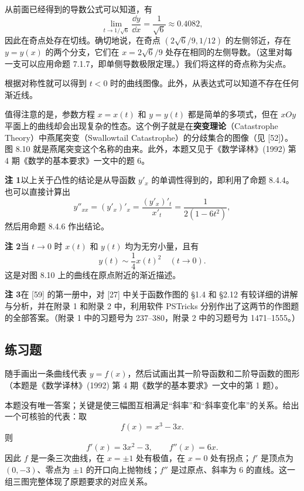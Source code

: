 \begin{xsolution}
从前面已经得到的导数公式可以知道，有
\[
  \lim_{t\to1/\sqrt6}\frac{\dd y}{\dd x}=\frac1{\sqrt6}\approx0.4082,
\]
因此在奇点处存在切线。确切地说，在奇点 $(2\sqrt6/9,1/12)$ 的左侧邻近，存在 $y=y(x)$ 的两个分支，它们在 $x=2\sqrt6/9$ 处存在相同的左侧导数。（这里对每一支可以应用命题 7.1.7，即单侧导数极限定理。）我们将这样的奇点称为尖点。

根据对称性就可以得到 $t<0$ 时的曲线图像。此外，从表达式可以知道不存在任何渐近线。

值得注意的是，参数方程 $x=x(t)$ 和 $y=y(t)$ 都是简单的多项式，但在 $xOy$ 平面上的曲线却会出现复杂的性态。这个例子就是在\textbf{突变理论}（Catastrophe Theory）中燕尾突变（Swallowtail Catastrophe）的分歧集合的图像（见 [52]）。图 8.10 就是燕尾突变这个名称的由来。此外，本题又见于《数学译林》(1992) 第 4 期《数学的基本要求》一文中的题 6。

\begin{xremark}
\textbf{注 1}\quad 以上关于凸性的结论是从导函数 $y'_x$ 的单调性得到的，即利用了命题 8.4.4。也可以直接计算出
\[
  y''_{xx}=(y'_x)'_x=\frac{(y'_x)'_t}{x'_t}
  =\frac1{2(1-6t^2)},
\]
然后用命题 8.4.6 作出结论。

\textbf{注 2}\quad 当 $t\to0$ 时 $x(t)$ 和 $y(t)$ 均为无穷小量，且有
\[
  y(t)\sim\frac14x(t)^2\quad(t\to0).
\]
这是对图 8.10 上的曲线在原点附近的渐近描述。

\textbf{注 3}\quad 在 [59] 的第一册中，对 [27] 中关于函数作图的 §1.4 和 §2.12 有较详细的讲解与分析，并在附录 1 和附录 2 中，利用软件 PSTricks 分别作出了这两节的作图题的全部答案。（附录 1 中的习题号为 237--380，附录 2 中的习题号为 1471--1555。）
\end{xremark}
\end{xsolution}

\subsection{练习题}

\begin{xexercise}[1]
随手画出一条曲线代表 $y=f(x)$，然后试画出其一阶导函数和二阶导函数的图形（本题是《数学译林》(1992) 第 4 期《数学的基本要求》一文中的第 1 题）。
\end{xexercise}
\begin{xsolution}
本题没有唯一答案；关键是使三幅图互相满足“斜率”和“斜率变化率”的关系。给出一个可核验的代表：取
\[
  f(x)=x^3-3x.
\]
则
\[
  f'(x)=3x^2-3,
  \qquad
  f''(x)=6x.
\]
因此 $f$ 是一条三次曲线，在 $x=\pm1$ 处有极值，在 $x=0$ 处有拐点；$f'$ 是顶点为 $(0,-3)$、零点为 $\pm1$ 的开口向上抛物线；$f''$ 是过原点、斜率为 6 的直线。这一组三图完整体现了原题要求的对应关系。
\end{xsolution}


